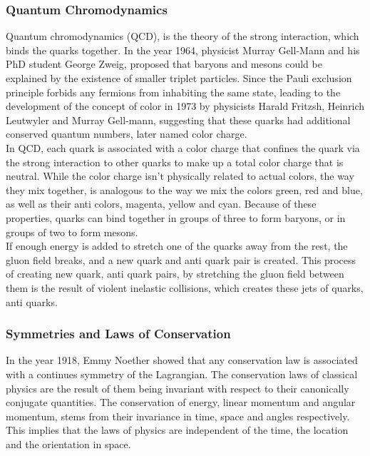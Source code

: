 \documentclass[12pt,a4paper]{article}
\numberwithin{equation}{section}
\begin{document}
\subsubsection{Quantum Chromodynamics}
Quantum chromodynamics (QCD), is the theory of the strong interaction, which
binds the quarks together. In the year 1964, physicist Murray Gell-Mann and his
PhD student George Zweig, proposed that baryons and mesons could be explained by
the existence of smaller triplet particles\cite{GELLMANN1964214}. Since the
Pauli exclusion principle forbids any fermions from inhabiting the same state,
leading to the development of the concept of color in 1973\cite{FRITZSCH1973365}
by physicists Harald Fritzsh, Heinrich Leutwyler and Murray Gell-mann,
suggesting that these quarks had additional conserved
quantum numbers, later named color charge.\\

In QCD, each quark is associated with a color charge that confines the quark via
the strong interaction to other quarks to make up a total color charge that is
neutral. While the color charge isn't physically related to actual colors, the
way they mix together, is analogous to the way we mix the colors green, red and
blue, as well as their anti colors, magenta, yellow and cyan. Because of these
properties, quarks can bind together in groups of three to form baryons, or in
groups of two to form mesons.\\

If enough energy is added to stretch one of the quarks away from the rest, the
gluon field breaks, and a new quark and anti quark pair is created. This process
of creating new quark, anti quark pairs, by stretching the gluon field between
them is the result of violent inelastic collisions, which creates these jets of
quarks, anti quarks.\\

\subsubsection{Symmetries and Laws of Conservation}
In the year 1918, Emmy Noether showed that any conservation law is associated
with a continues symmetry of the Lagrangian\cite{Noether_1971}. The
conservation laws of classical physics are the result of them being invariant
with respect to their canonically conjugate quantities. The conservation of
energy, linear momentum and angular momentum, stems from their invariance in
time, space and angles respectively. This implies that the laws of physics are
independent of the time, the location and the orientation in space.\\
\end{document}
